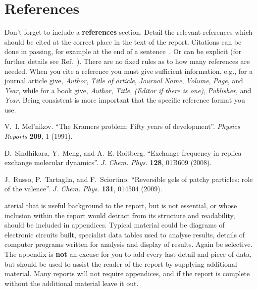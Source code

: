 \documentclass[a4paper,12pt]{article}
\begin{document}
\section{References}

Don't forget to include a \textbf{references} section. Detail the relevant 
references which should be cited at the correct place in the text of the 
report. Citations can be done in passing, for example at the end of a 
sentence~\cite{mel1991}. Or can be explicit (for further details see 
Ref.~\cite{sindhikara2008}). There are no fixed rules as to how many 
references are needed. 
When you cite a reference you must give sufficient information, e.g., for a journal article give, {\it Author}, {\it Title of
article},
{\it Journal Name}, {\it Volume}, {\it Page}, and {\it Year}, 
while for a book give, {\it Author}, {\it Title},
{\it (Editor if there is one)}, {\it Publisher}, and {\it Year}.  
Being consistent is more important that the specific reference format
you use.

\begingroup
\renewcommand{\section}[2]{}  %

\begin{thebibliography}{10}
V.~I. Mel'nikov. ``The Kramers problem: Fifty years of development''.
\textit{Physics Reports} \textbf{209}, 1 (1991).

D.~Sindhikara, Y.~Meng, and A.~E. Roitberg.
``Exchange frequency in replica exchange molecular dynamics''.
\textit{J. Chem. Phys.} \textbf{128}, 01B609 (2008).

J.~Russo, P.~Tartaglia, and F.~Sciortino.
``Reversible gels of patchy particles: role of the valence''.
\textit{J. Chem. Phys.} \textbf{131}, 014504 (2009).
\end{thebibliography}

\endgroup


\appendix
\section{Appendices}

Material that is useful background to the report, but is not essential,
or whose inclusion within the report  would detract from its
structure and readability, should be included in appendices. Typical
material could be diagrams of electronic circuits built, specialist
data tables used to analyse results, details of computer programs
written for analysis and display of results. Again be selective. The appendix is {\bf not} an excuse for you to add every
last detail and piece of data, but should be used to assist the reader
of the report by supplying additional material. Many reports will not require
appendices, and if the report is complete without the additional
material leave it out.
\end{document}
